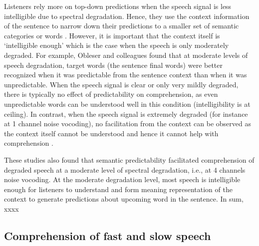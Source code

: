 \documentclass[a4paper, nobind]{templates/ociamthesis}
\begin{document}
Listeners rely more on top-down predictions when the speech signal is less intelligible due to spectral degradation.
Hence, they use the context information of the sentence to narrow down their predictions to a smaller set of semantic categories or words \autocites{Strauss2013}[see also,][]{Corps2020}.
However, it is important that the context itself is `intelligible enough' which is the case when the speech is only moderately degraded.
For example, Obleser and colleagues \autocite{Obleser2007,Obleser2010,Obleser2011} found that at moderate levels of speech degradation, target words (the sentence final words) were better recognized when it was predictable from the sentence context than when it was unpredictable.
When the speech signal is clear or only very mildly degraded, there is typically no effect of predictability on comprehension, as even unpredictable words can be understood well in this condition (intelligibility is at ceiling).
In contrast, when the speech signal is extremely degraded (for instance at 1 channel noise vocoding), no facilitation from the context can be observed as the context itself cannot be understood and hence it cannot help with comprehension \autocite{Bhandari2021,Obleser2007,Obleser2010,Obleser2011}.

These studies also found that semantic predictability facilitated comprehension of degraded speech at a moderate level of spectral degradation, i.e., at 4 channels noise vocoding.
At the moderate degradation level, most speech is intelligible enough for listeners to understand and form meaning representation of the context to generate predictions about upcoming word in the sentence.
In sum, xxxx

\hypertarget{comprehension-of-fast-and-slow-speech}{%
\subsection{Comprehension of fast and slow speech}\label{comprehension-of-fast-and-slow-speech}}
\end{document}
